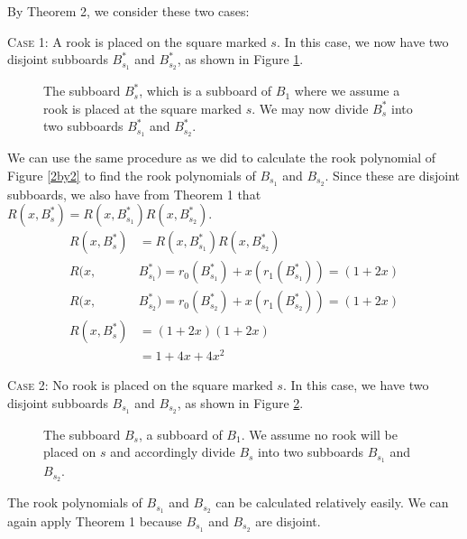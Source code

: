 \documentclass{article}
\newcommand{\w}{0.5}
\newcommand{\ww}{0.25}
\newcommand{\places}[2]{\draw (#1*\w cm - \ww cm, #2*\w cm - \ww cm) node {$s$};}
\newcommand{\placelabel}[3]{\draw (#1*\w cm - \ww cm, #2*\w cm - \ww cm) node {#3};}
\newcommand{\shadesquare}[2]{\filldraw[fill=gray!40!white, draw=black] (#1*\w - \w,#2*\w - \w) rectangle (#1*\w,#2*\w);}
\newcommand{\unshadesquare}[2]{\filldraw[fill=white, draw=black] (#1*\w - \w,#2*\w - \w) rectangle (#1*\w,#2*\w);}
\begin{document}
By Theorem 2, we consider these two cases:

\textsc{Case 1:} A rook is placed on the square marked $s$. In this case, we now have two disjoint subboards $B_{s_1}^*$ and $B_{s_2}^*$, as shown in Figure \ref{Bs*}.

\begin{figure}[!h]
    \centering
    \caption{The subboard $B_{s}^*$, which is a subboard of $B_1$ where we assume a rook is placed at the square marked $s$. We may now divide $B_{s}^*$ into two subboards $B_{s_1}^*$ and $B_{s_2}^*$.}
    \label{Bs*}
\end{figure}

We can use the same procedure as we did to calculate the rook polynomial of Figure \ref{2by2} to find the rook polynomials of $B_{s_1}$ and $B_{s_2}$. Since these are disjoint subboards, we also have from Theorem 1 that $R(x,B_s^*) = R(x,B_{s_1}^*)R(x,B_{s_2}^*)$.
\begin{align*}
R(x, B_{s}^*) &= R(x, B_{s_1}^*)R(x, B_{s_2}^*) \\
R(x, &B_{s_1}^*) = r_0(B_{s_1}^*) + x(r_1(B_{s_1}^*))= (1 + 2x) \\
R(x, &B_{s_2}^*) = r_0(B_{s_2}^*) + x(r_1(B_{s_2}^*))= (1 + 2x) \\
R(x, B_{s}^*) &= (1 + 2x)(1 + 2x) \\
&= 1 + 4x + 4x^2
\end{align*}

\textsc{Case 2:} No rook is placed on the square marked $s$. In this case, we have two disjoint subboards $B_{s_1}$ and $B_{s_2}$, as shown in Figure \ref{Bs}.

\begin{figure}[!h]
    \centering
    \caption{The subboard $B_s$, a subboard of $B_1$. We assume no rook will be placed on $s$ and accordingly divide $B_s$ into two subboards $B_{s_1}$ and $B_{s_2}$.}
    \label{Bs}
\end{figure}
The rook polynomials of $B_{s_1}$ and $B_{s_2}$ can be calculated relatively easily. We can again apply Theorem 1 because $B_{s_1}$ and $B_{s_2}$ are disjoint.
\end{document}
